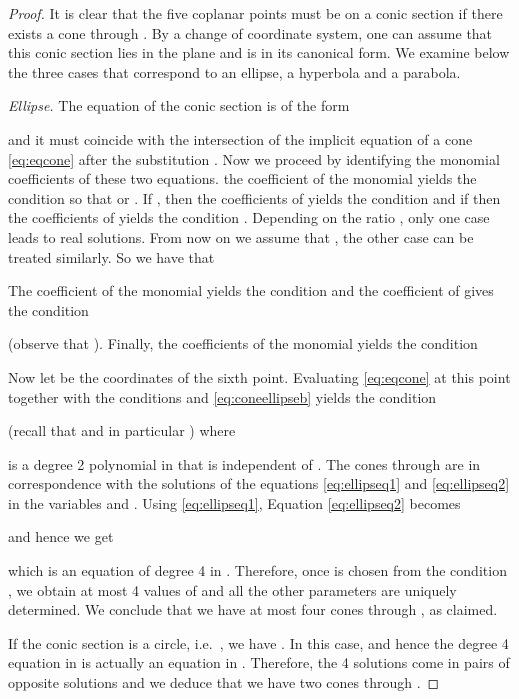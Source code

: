 \documentclass[5p]{elsarticle}
\newcommand{\com}[1]{{\color{black} #1}}
\newcommand{\lb}[1]{{\color{black} #1}}
\begin{document}
\begin{proof}It is clear that the five coplanar points must be on a conic section if there exists a cone through . By a change of coordinate system, one can assume that this conic section \com{lies in the plane}  and is in its canonical form. We examine below the three cases that correspond to an ellipse, \com{a hyperbola} and a parabola. 

\medskip	
	
\noindent \textit{Ellipse.} The equation of the conic section is of the form 

and it must coincide with the intersection of the implicit equation of a cone \eqref{eq:eqcone} after the substitution . \com{Now} we proceed by \lb{identifying} the monomial coefficients of these two equations. the coefficient of the monomial  yields the condition  so that  or . If , then the coefficients of  yields the condition  and if  then the coefficients of  yields the condition . Depending on the ratio , only one case leads to real solutions. From now on we assume that , the other case can be treated similarly. So we have that 

The coefficient of the monomial  yields the condition  and the coefficient of  gives the condition

(observe that ). 
Finally, the coefficients of the monomial  yields the condition

\com{Now} let  be the coordinates of the sixth point. \com{Evaluating} \eqref{eq:eqcone} at this point together with the conditions  and \eqref{eq:coneellipseb} yields the condition 

(recall that  and in particular ) where

is a degree 2 polynomial in  \com{that} is independent of . The cones through  are in correspondence with the solutions of the equations \eqref{eq:ellipseq1} and \eqref{eq:ellipseq2} in the variables  and . Using \eqref{eq:ellipseq1}, Equation \eqref{eq:ellipseq2} becomes

and hence we get

which is an equation of degree 4 in . Therefore, once  is chosen from the condition , we obtain at most 4 values of  and all the \com{other} parameters are uniquely determined. We conclude that we have at most four cones through , as claimed. 

If the conic section is a circle, i.e.~, we have . In this case,  and hence the degree 4 equation in  is actually an equation in . Therefore, the 4 solutions \com{come in} pairs of opposite solutions and we deduce that we have two cones through .


\end{proof}
\end{document}
